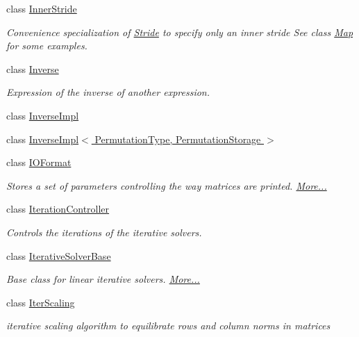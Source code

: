 \begin{DoxyCompactItemize}
class \hyperlink{class_eigen_1_1_inner_stride}{Inner\+Stride}
\begin{DoxyCompactList}\small\item\em Convenience specialization of \hyperlink{group___core___module_class_eigen_1_1_stride}{Stride} to specify only an inner stride See class \hyperlink{group___core___module_class_eigen_1_1_map}{Map} for some examples. \end{DoxyCompactList}\item 
class \hyperlink{class_eigen_1_1_inverse}{Inverse}
\begin{DoxyCompactList}\small\item\em Expression of the inverse of another expression. \end{DoxyCompactList}\item 
class \hyperlink{class_eigen_1_1_inverse_impl}{Inverse\+Impl}
\item 
class \hyperlink{class_eigen_1_1_inverse_impl_3_01_permutation_type_00_01_permutation_storage_01_4}{Inverse\+Impl$<$ Permutation\+Type, Permutation\+Storage $>$}
\item 
class \hyperlink{group___core___module_struct_eigen_1_1_i_o_format}{I\+O\+Format}
\begin{DoxyCompactList}\small\item\em Stores a set of parameters controlling the way matrices are printed.  \hyperlink{group___core___module_struct_eigen_1_1_i_o_format}{More...}\end{DoxyCompactList}\item 
class \hyperlink{class_eigen_1_1_iteration_controller}{Iteration\+Controller}
\begin{DoxyCompactList}\small\item\em Controls the iterations of the iterative solvers. \end{DoxyCompactList}\item 
class \hyperlink{group___iterative_linear_solvers___module_class_eigen_1_1_iterative_solver_base}{Iterative\+Solver\+Base}
\begin{DoxyCompactList}\small\item\em Base class for linear iterative solvers.  \hyperlink{group___iterative_linear_solvers___module_class_eigen_1_1_iterative_solver_base}{More...}\end{DoxyCompactList}\item 
class \hyperlink{class_eigen_1_1_iter_scaling}{Iter\+Scaling}
\begin{DoxyCompactList}\small\item\em iterative scaling algorithm to equilibrate rows and column norms in matrices \end{DoxyCompactList}\item 

\end{DoxyCompactItemize}
